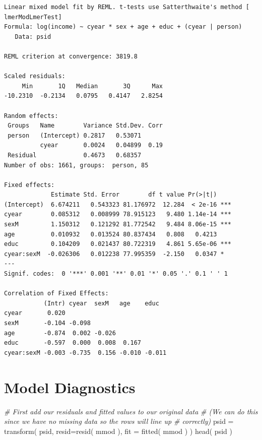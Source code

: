 \documentclass[
  letterpaper,
  DIV=11,
  numbers=noendperiod]{scrreprt}
\newenvironment{Shaded}{}{}
\newcommand{\AttributeTok}[1]{\textcolor[rgb]{0.49,0.56,0.16}{#1}}
\newcommand{\CommentTok}[1]{\textcolor[rgb]{0.38,0.63,0.69}{\textit{#1}}}
\newcommand{\FunctionTok}[1]{\textcolor[rgb]{0.02,0.16,0.49}{#1}}
\newcommand{\NormalTok}[1]{#1}
\newcommand{\OtherTok}[1]{\textcolor[rgb]{0.00,0.44,0.13}{#1}}
\begin{document}
\begin{verbatim}
Linear mixed model fit by REML. t-tests use Satterthwaite's method [
lmerModLmerTest]
Formula: log(income) ~ cyear * sex + age + educ + (cyear | person)
   Data: psid

REML criterion at convergence: 3819.8

Scaled residuals: 
     Min       1Q   Median       3Q      Max 
-10.2310  -0.2134   0.0795   0.4147   2.8254 

Random effects:
 Groups   Name        Variance Std.Dev. Corr
 person   (Intercept) 0.2817   0.53071      
          cyear       0.0024   0.04899  0.19
 Residual             0.4673   0.68357      
Number of obs: 1661, groups:  person, 85

Fixed effects:
             Estimate Std. Error        df t value Pr(>|t|)    
(Intercept)  6.674211   0.543323 81.176972  12.284  < 2e-16 ***
cyear        0.085312   0.008999 78.915123   9.480 1.14e-14 ***
sexM         1.150312   0.121292 81.772542   9.484 8.06e-15 ***
age          0.010932   0.013524 80.837434   0.808   0.4213    
educ         0.104209   0.021437 80.722319   4.861 5.65e-06 ***
cyear:sexM  -0.026306   0.012238 77.995359  -2.150   0.0347 *  
---
Signif. codes:  0 '***' 0.001 '**' 0.01 '*' 0.05 '.' 0.1 ' ' 1

Correlation of Fixed Effects:
           (Intr) cyear  sexM   age    educ  
cyear       0.020                            
sexM       -0.104 -0.098                     
age        -0.874  0.002 -0.026              
educ       -0.597  0.000  0.008  0.167       
cyear:sexM -0.003 -0.735  0.156 -0.010 -0.011
\end{verbatim}

\section{Model Diagnostics}\label{model-diagnostics}

\begin{Shaded}
\begin{Highlighting}[]
\CommentTok{\# First add our residuals and fitted values to our original data}
\CommentTok{\# (We can do this since we have no missing data so the rows will line up}
\CommentTok{\# correctly)}
\NormalTok{psid }\OtherTok{=} \FunctionTok{transform}\NormalTok{( psid,  }\AttributeTok{resid=}\FunctionTok{resid}\NormalTok{( mmod ),}
                  \AttributeTok{fit =} \FunctionTok{fitted}\NormalTok{( mmod ) )}
\FunctionTok{head}\NormalTok{( psid )}
\end{Highlighting}
\end{Shaded}
\end{document}
